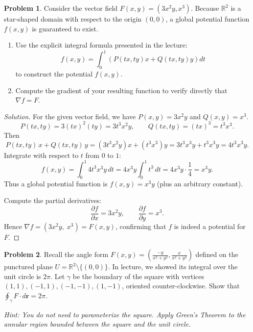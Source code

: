 \documentclass[12pt, a4paper]{article}
\theoremstyle{definition}
\newtheorem{problem}{Problem}
\newenvironment{solution}
  {\renewcommand\qedsymbol{$\blacksquare$}\begin{proof}[Solution]}
  {\end{proof}}
\begin{document}
\vfill
\newpage

\begin{problem}
Consider the vector field $F(x,y) = (3x^2y, x^3)$. Because $\mathbb{R}^2$ is a star-shaped domain with respect to the origin $(0,0)$, a global potential function $f(x,y)$ is guaranteed to exist.
\begin{enumerate}
    \item[(a)] Use the explicit integral formula presented in the lecture: 
    $$f(x,y) = \int_0^1 \left( P(tx,ty)x + Q(tx,ty)y \right) dt$$
    to construct the potential $f(x,y)$.
    \item[(b)] Compute the gradient of your resulting function to verify directly that $\nabla f = F$.
\end{enumerate}
\end{problem}

\begin{solution}
\item[(a)] For the given vector field, we have \( P(x,y)=3x^2y \) and \( Q(x,y)=x^3 \). 
\[
P(tx, ty) = 3(tx)^2(ty) = 3t^3 x^2 y, \qquad
Q(tx, ty) = (tx)^3 = t^3 x^3.
\]
Then
\[
P(tx, ty)\,x + Q(tx, ty)\,y = (3t^3 x^2 y)x + (t^3 x^3)y = 3t^3 x^3 y + t^3 x^3 y = 4t^3 x^3 y.
\]
Integrate with respect to \( t \) from \( 0 \) to \( 1 \):
\[
f(x,y) = \int_0^1 4t^3 x^3 y \, dt = 4x^3 y \int_0^1 t^3\, dt = 4x^3 y \cdot \frac{1}{4} = x^3 y.
\]
Thus a global potential function is \( f(x,y) = x^3 y \) (plus an arbitrary constant).

\item[(b)] Compute the partial derivatives:
\[
\frac{\partial f}{\partial x} = 3x^2 y, \qquad
\frac{\partial f}{\partial y} = x^3.
\]
Hence \( \nabla f = (3x^2 y,\; x^3) = F(x,y) \), confirming that \( f \) is indeed a potential for \( F \).
\end{solution}

\vfill

\begin{problem}
Recall the angle form $F(x,y) = \left(\frac{-y}{x^2+y^2}, \frac{x}{x^2+y^2}\right)$ defined on the punctured plane $U = \mathbb{R}^2 \setminus \{(0,0)\}$. In lecture, we showed its integral over the unit circle is $2\pi$. Let $\gamma$ be the boundary of the square with vertices $(1,1), (-1,1), (-1,-1), (1,-1)$, oriented counter-clockwise. Show that $\oint_\gamma F \cdot d\mathbf{r} = 2\pi$. 

\textit{Hint: You do not need to parameterize the square. Apply Green's Theorem to the annular region bounded between the square and the unit circle.}
\end{problem}
\end{document}
